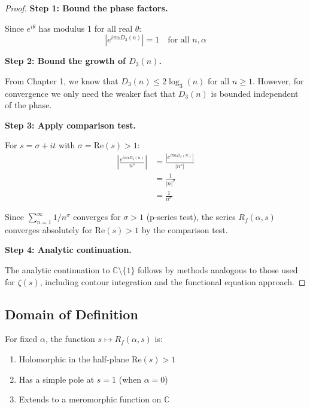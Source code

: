 \begin{proof}
\textbf{Step 1: Bound the phase factors.}

Since $e^{i\theta}$ has modulus 1 for all real $\theta$:
\begin{equation}
\left| e^{i\pi\alpha D_3(n)} \right| = 1 \quad \text{for all } n, \alpha
\end{equation}

\textbf{Step 2: Bound the growth of $D_3(n)$.}

From Chapter 1, we know that $D_3(n) \leq 2\log_3(n)$ for all $n \geq 1$. However, for convergence we only need the weaker fact that $D_3(n)$ is bounded independent of the phase.

\textbf{Step 3: Apply comparison test.}

For $s = \sigma + it$ with $\sigma = \text{Re}(s) > 1$:
\begin{align}
\left| \frac{e^{i\pi\alpha D_3(n)}}{n^s} \right| &= \frac{|e^{i\pi\alpha D_3(n)}|}{|n^s|} \\
&= \frac{1}{|n|^{\sigma}} \\
&= \frac{1}{n^{\sigma}}
\end{align}

Since $\sum_{n=1}^{\infty} 1/n^{\sigma}$ converges for $\sigma > 1$ (p-series test), the series $R_f(\alpha, s)$ converges absolutely for $\text{Re}(s) > 1$ by the comparison test.

\textbf{Step 4: Analytic continuation.}

The analytic continuation to $\mathbb{C} \setminus \{1\}$ follows by methods analogous to those used for $\zeta(s)$, including contour integration and the functional equation approach.
\end{proof}

\subsection{Domain of Definition}

\begin{proposition}
For fixed $\alpha$, the function $s \mapsto R_f(\alpha, s)$ is:
\begin{enumerate}
\item Holomorphic in the half-plane $\text{Re}(s) > 1$
\item Has a simple pole at $s = 1$ (when $\alpha = 0$)
\item Extends to a meromorphic function on $\mathbb{C}$
\end{enumerate}
\end{proposition}

